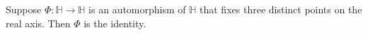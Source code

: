 Suppose $\Phi: \mathbb{H} \to \mathbb{H}$ is an automorphism of $\mathbb{H}$ that fixes three distinct points on the 
real axis. Then $\Phi$ is the identity.


\begin{solution}
  \ \\
\end{solution}